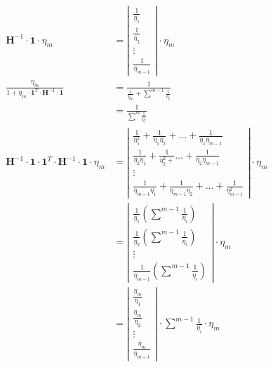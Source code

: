 \documentclass{article}
\begin{document}
\begin{subequations}
    \begin{align}
        \boldsymbol{H}^{-1} \cdot \boldsymbol{1} \cdot \eta_m &= \left| \begin{matrix} \frac{1}{\eta_1} \\ \frac{1}{\eta_2} \\ \vdots \\ \frac{1}{\eta_{m - 1}} \end{matrix}\right| \cdot \eta_m \\
        \frac{\eta_m}{1 + \eta_m \cdot \boldsymbol{1}^{T} \cdot \boldsymbol{H}^{-1} \cdot \boldsymbol{1}} &= \frac{1}{\frac{1}{\eta_m} + \sum^{m - 1}{\frac{1}{\eta_i}}} \nonumber \\
        &= \frac{1}{\sum^{m}{\frac{1}{\eta_i}}} \\
        \boldsymbol{H}^{-1} \cdot \boldsymbol{1} \cdot \boldsymbol{1}^{T} \cdot \boldsymbol{H}^{-1} \cdot \boldsymbol{1} \cdot \eta_m &= \left| \begin{matrix} \frac{1}{\eta_1^2} + \frac{1}{\eta_1 \eta_2} + \dots + \frac{1}{\eta_1 \eta_{m - 1}} \\ \frac{1}{\eta_2 \eta_1} + \frac{1}{\eta_{2}^{2} +} \dots + \frac{1}{\eta_2 \eta_{m - 1}}  \\ \vdots \\ \frac{1}{\eta_{m - 1} \eta_1} + \frac{1}{\eta_{m - 1} \eta_2} + \dots + \frac{1}{\eta_{m - 1}^{2}} \end{matrix} \right| \cdot \eta_m \nonumber \\
        &= \left| \begin{matrix}\frac{1}{\eta_1} \left(\sum^{m - 1}{\frac{1}{\eta_i}}\right) \\ \frac{1}{\eta_2} \left(\sum^{m - 1}{\frac{1}{\eta_i}}\right) \\ \vdots \\ \frac{1}{\eta_{m - 1}} \left(\sum^{m - 1}{\frac{1}{\eta_i}}\right) \end{matrix} \right| \cdot \eta_m \nonumber \\
        &= \left| \begin{matrix} \frac{\eta_m}{\eta_1} \\ \frac{\eta_m}{\eta_2} \\ \vdots \\ \frac{\eta_m}{\eta_{m - 1}} \end{matrix} \right| \cdot \sum^{m - 1}{\frac{1}{\eta_i}} \cdot \eta_m
    \end{align}
\end{subequations}
\end{document}
